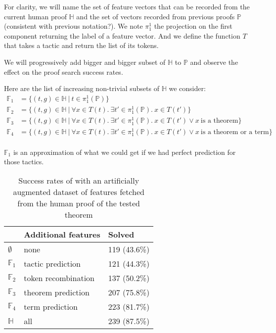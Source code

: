 \documentclass[runningheads,a4paper,draft]{svjour3}
\newcommand{\ra}[1]{\renewcommand{\arraystretch}{#1}}
\begin{document}
For clarity, we will name the set of feature vectors that can be recorded from 
the current human proof $\mathbb{H}$ and the set of vectors recorded from 
previous proofs $\mathbb{P}$ (consistent with previous notation?). We note 
$\pi_1^1$ the projection on the 
first component returning the label of a feature vector. And we define the 
function $T$ that takes a tactic and return the list of its tokens.

We will progressively add bigger and bigger 
subset of $\mathbb{H}$ to $\mathbb{P}$ and observe the effect on the proof 
search success rates. 

Here are the list of increasing non-trivial subsets of $\mathbb{H}$ we consider:
\begin{align*}
\mathbb{F}_1 &= \lbrace (t,g) \in \mathbb{H}\ |\ t \in \pi_1^1(\mathbb{P})  
   \rbrace \\
\mathbb{F}_2 &= \lbrace (t,g) \in \mathbb{H}\ |\ \forall x \in T(t).\ \exists 
t'\in \pi_1^1(\mathbb{P}).\ x \in T(t') \rbrace\\
\mathbb{F}_3 &= \lbrace (t,g) \in \mathbb{H}\ |\ \forall x \in T(t).\ \exists 
t'\in \pi_1^1(\mathbb{P}).\ x \in T(t') \vee x\ \mbox{is a theorem} \rbrace\\
\mathbb{F}_4 &= \lbrace (t,g) \in \mathbb{H}\ |\ \forall x \in T(t).\ \exists 
t'\in \pi_1^1(\mathbb{P}).\ x \in T(t') \vee x\ \mbox{is a theorem or a term} 
\rbrace\\
\end{align*}


$\mathbb{F}_1$ is an approximation of what we could get if we had perfect 
prediction for those tactics.


\begin{table}[h]
\centering\ra{1.3}
\small
\begin{tabular}{lll}
\toprule
 & Additional features & Solved \\
\midrule
$\emptyset$ & none & 119 (43.6\%) \\ %
$\mathbb{F}_1$& tactic prediction & 121 (44.3\%) \\ %
$\mathbb{F}_2$& token recombination  & 137 (50.2\%) \\ %
$\mathbb{F}_3$& theorem prediction  & 207 (75.8\%) \\ %
$\mathbb{F}_4$& term prediction & 223 (81.7\%) \\ %
$\mathbb{H}$     & all & 239 (87.5\%) \\ %
\bottomrule
\end{tabular}
\caption{\label{tab:featue_param} Success rates of with an artificially 
augmented dataset of features fetched from the human proof of the tested 
theorem}
\end{table}
\end{document}
